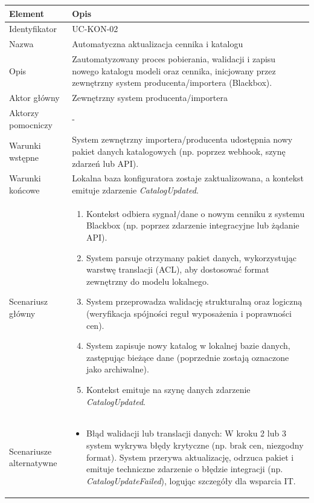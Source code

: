 \begin{longtable}{|p{4cm}|p{11cm}|}
\hline
\textbf{Element} & \textbf{Opis} \\
\hline

Identyfikator & UC-KON-02 \\
\hline

Nazwa & Automatyczna aktualizacja cennika i katalogu \\
\hline

Opis & 
Zautomatyzowany proces pobierania, walidacji i zapisu nowego katalogu modeli oraz cennika, inicjowany przez zewnętrzny system producenta/importera (Blackbox). \\
\hline

Aktor główny & Zewnętrzny system producenta/importera \\
\hline

Aktorzy pomocniczy & - \\
\hline

Warunki wstępne & 
System zewnętrzny importera/producenta udostępnia nowy pakiet danych katalogowych (np. poprzez webhook, szynę zdarzeń lub API). \\
\hline

Warunki końcowe & 
Lokalna baza konfiguratora zostaje zaktualizowana, a kontekst emituje zdarzenie \textit{CatalogUpdated}. \\
\hline

Scenariusz główny & 
\begin{enumerate}
    \item Kontekst odbiera sygnał/dane o nowym cenniku z systemu Blackbox (np. poprzez zdarzenie integracyjne lub żądanie API).
    \item System parsuje otrzymany pakiet danych, wykorzystując warstwę translacji (ACL), aby dostosować format zewnętrzny do modelu lokalnego.
    \item System przeprowadza walidację strukturalną oraz logiczną (weryfikacja spójności reguł wyposażenia i poprawności cen).
    \item System zapisuje nowy katalog w lokalnej bazie danych, zastępując bieżące dane (poprzednie zostają oznaczone jako archiwalne).
    \item Kontekst emituje na szynę danych zdarzenie \textit{CatalogUpdated}.
\end{enumerate} \\
\hline

Scenariusze alternatywne & 
\begin{itemize}
    \item [A1] Błąd walidacji lub translacji danych: W kroku 2 lub 3 system wykrywa błędy krytyczne (np. brak cen, niezgodny format). System przerywa aktualizację, odrzuca pakiet i emituje techniczne zdarzenie o błędzie integracji (np. \textit{CatalogUpdateFailed}), logując szczegóły dla wsparcia IT.
\end{itemize} \\
\hline
\end{longtable}
